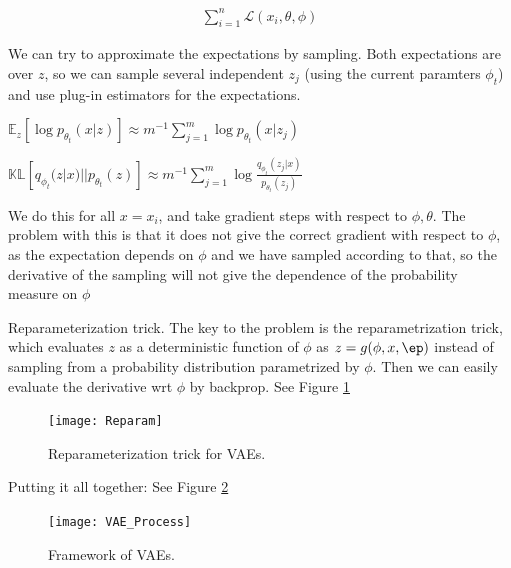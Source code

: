 \documentclass[english]{article}
\begin{document}
\begin{align*}
\sum_{i=1}^n \mathcal{L}(x_i, \theta, \phi)
\end{align*}

We can try to approximate the expectations by sampling. Both expectations are over $z$, so we can sample several independent $z_j$ (using the current paramters $\phi_t$) and use plug-in estimators for the expectations. 


$\mathbb{E}_{z}[\log p_{\theta_t}(x|z)]
\approx
m^{-1}\sum_{j=1}^m \log p_{\theta_t}(x|z_j)
$

$
\mathbb{KL}[q_{\phi_t}(z|x)||p_{\theta_t}(z)]\approx
m^{-1}\sum_{j=1}^m
\log\frac{q_{\phi_t}(z_j|x)}{p_{\theta_t}(z_j)}
$

We do this for all $x=x_i$, and take gradient steps with respect to $\phi,\theta$. The problem with this is that it does not give the correct gradient with respect to $\phi$, as the expectation depends on $\phi$ and we have sampled according to that, so the derivative of the sampling will not give the dependence of the probability measure on $\phi$










\item 
Reparameterization trick. The key to the problem is the reparametrization trick, which evaluates $z$ as a deterministic function of $\phi$ as $z = g(\phi,x,\ep)$ instead of sampling from a probability distribution parametrized by $\phi$. Then we can easily evaluate the derivative wrt $\phi$ by backprop. See Figure \ref{Reparam}


\begin{figure}[H]\centering
\texttt{[image: Reparam]}
\caption{Reparameterization trick for VAEs.}
\label{Reparam}
\end{figure}

Putting it all together: See Figure \ref{VAE_Process}

\begin{figure}[H]\centering
\texttt{[image: VAE\_Process]}
\caption{Framework of VAEs.}
\label{VAE_Process}
\end{figure}





\end{document}
